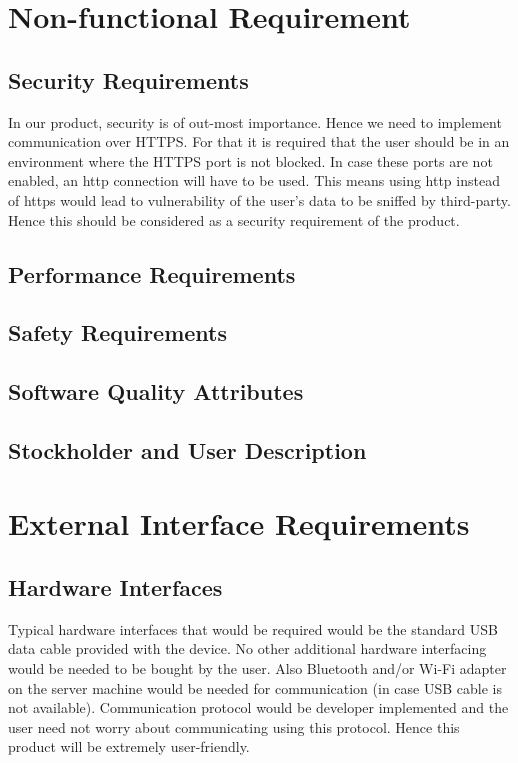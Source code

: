 \section{Non-functional Requirement}
\subsection{Security Requirements}
\hspace*{0.82cm}In our product, security is of out-most importance. Hence we need to implement
communication over HTTPS. For that it is required that the user should be in an environment where
the HTTPS port is not blocked. In case these ports are not enabled, an http connection will have to be
used. This means using http instead of https would lead to vulnerability of the user’s data to be sniffed
by third-party. Hence this should be considered as a security requirement of the product.

\subsection{Performance Requirements}
\subsection{Safety Requirements}
\subsection{Software Quality Attributes}
\subsection{Stockholder and User Description}

\section{External Interface Requirements}
\subsection{Hardware Interfaces}
\hspace*{0.82cm}Typical hardware interfaces that would be required would be the standard USB data cable
provided with the device. No other additional hardware interfacing would be needed to be bought by
the user. Also Bluetooth and/or Wi-Fi adapter on the server machine would be needed for
communication (in case USB cable is not available). Communication protocol would be developer
implemented and the user need not worry about communicating using this protocol. Hence this
product will be extremely user-friendly.

